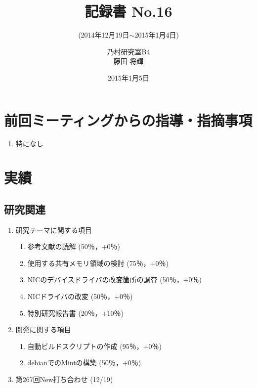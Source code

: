 \documentclass[fleqn, 14pt]{extarticle}
\subtitle{(2014年12月19日$\sim$2015年1月4日)}
\author{乃村研究室B4\\藤田 将輝}
\date{2015年1月5日}
\title{記録書 No.16}
\begin{document}
\maketitle
\section{前回ミーティングからの指導・指摘事項}
\label{sec-1}
\begin{enumerate}
\item 特になし
\newline
\hfill

\end{enumerate}




\section{実績}
\label{sec-2}

\subsection{研究関連}
\label{sec-2-1}
\begin{enumerate}
    \item 研究テーマに関する項目
    \hfill
    \label{enum-research1}
    \begin{enumerate}

        \item 参考文献の読解
        \hfill
        \label{enum-1-A}
        (50％，+0％)
        \item 使用する共有メモリ領域の検討
        \hfill
        \label{enum-1-B}
        (75％，+0％)
        \item NICのデバイスドライバの改変箇所の調査
        \hfill
        \label{enum-1-C}
        (50％，+0％)
        \item NICドライバの改変
        \hfill
        \label{enum-1-D}
        (50％，+0％)
        \item 特別研究報告書
        \hfill
        \label{enum-1-E}
        (20％，+10％)

    \end{enumerate}
    \item 開発に関する項目
    \hfill
    \label{enum-research2}
    \begin{enumerate}

        \item 自動ビルドスクリプトの作成
        \hfill
        \label{enum-2-A}
        (95％，+0％)
        \item debianでのMintの構築
        \hfill
        \label{enum-2-A}
        (50％，+0％)
    \end{enumerate}
    \item 第267回New打ち合わせ 
    \hfill
    \label{enum-research3}
    (12/19)
    \end{enumerate}
\end{document}
